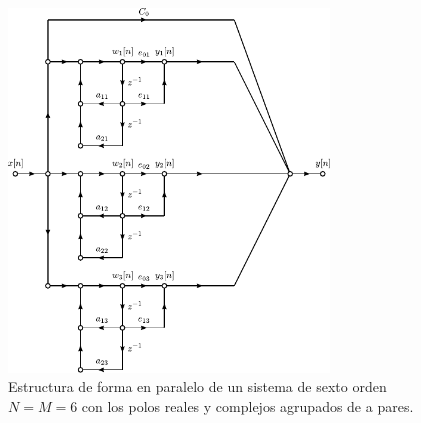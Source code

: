 \documentclass[a4paper]{report}
\begin{document}
\begin{figure}[!htb]
 \begin{center}
 \includegraphics[width=0.76\textwidth]{figuras/structures_flow_graph_iir_parallel_form.pdf}
 \caption{\label{fig:structures_flow_graph_iir_parallel_form} Estructura de forma en paralelo de un sistema de sexto orden \(N=M=6\) con los polos reales y complejos agrupados de a pares.}
 \end{center}
\end{figure}
\end{document}

